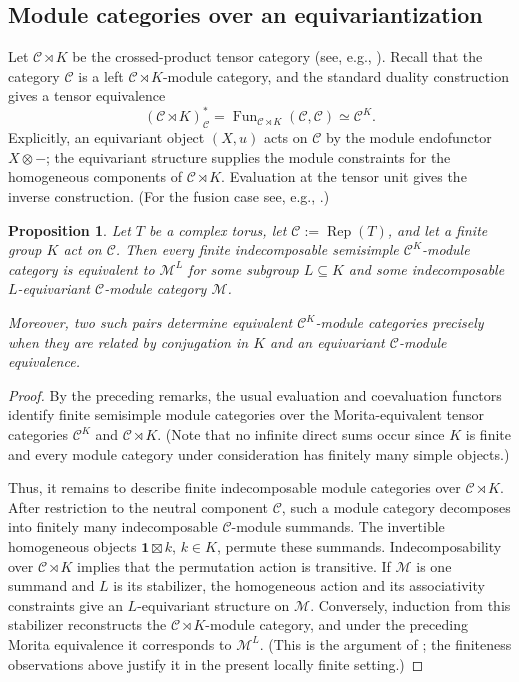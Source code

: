 \documentclass{amsart}
\newtheorem{proposition}[theorem]{Proposition}
\theoremstyle{definition}
\newcommand{\Fun}{\operatorname{Fun}}
\newcommand{\Rep}{\operatorname{Rep}}
\newcommand{\C}{\mathscr{C}}
\newcommand{\M}{\mathscr{M}}
\numberwithin{equation}{section}
\begin{document}
\subsection{Module categories over an equivariantization}\label{sec:module-classification-general}

Let $\C\rtimes K$ be the crossed-product tensor category (see, e.g., \cite[Definition 4.15.5]{EGNO}).  Recall that the category $\C$ is a
left $\C\rtimes K$-module category, and the standard duality construction gives a tensor equivalence
\[
 (\C\rtimes K)^*_{\C}=\Fun_{\C\rtimes K}(\C,\C)\simeq\C^K.
\]
Explicitly, an equivariant object $(X,u)$ acts on $\C$ by the module endofunctor
$X\otimes-$; the equivariant structure supplies the module constraints for the
homogeneous components of $\C\rtimes K$.  Evaluation at the tensor unit gives the
inverse construction. (For the fusion case see, e.g., \cite[Example 7.12.25]{EGNO}.)

\begin{proposition}\label{prop:equivariantization-modules}
Let $T$ be a complex torus, let $\C:=\Rep(T)$, and let a finite group $K$ act
on $\C$. Then every finite indecomposable semisimple $\C^K$-module category is
equivalent to $\M^L$ for some subgroup $L\subseteq K$ and some indecomposable
$L$-equivariant $\C$-module category $\M$.

Moreover, two such pairs determine equivalent $\C^K$-module categories precisely when they
are related by conjugation in $K$ and an equivariant $\C$-module equivalence.
\end{proposition}

\begin{proof}
By the preceding remarks, the usual evaluation and coevaluation functors 
identify finite semisimple module categories over the Morita-equivalent tensor
categories $\C^K$ and $\C\rtimes K$. (Note that no infinite direct sums occur since $K$ is finite and every module category
under consideration has finitely many simple objects.)

Thus, it remains to describe finite indecomposable module categories over
$\C\rtimes K$.  After restriction to the neutral component $\C$, such a module
category decomposes into finitely many indecomposable $\C$-module summands.  The
invertible homogeneous objects $\mathbf 1\boxtimes k$, $k\in K$, permute these summands.
Indecomposability over $\C\rtimes K$ implies that the permutation action is
transitive.  If $\M$ is one summand and $L$ is its stabilizer, the homogeneous
action and its associativity constraints give an $L$-equivariant structure on
$\M$.  Conversely, induction from this stabilizer reconstructs the
$\C\rtimes K$-module category, and under the preceding Morita equivalence it
corresponds to $\M^L$. (This is the argument of \cite[Proposition 5.4]{ENO}; the
finiteness observations above justify it in the present locally finite setting.)
\end{proof}
\end{document}
